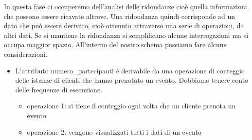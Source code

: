 In questa fase ci occuperemo dell'analisi delle ridondanze cioè quella informazioni che possono essere ricavate altrove.
Una ridondanza quindi corrisponde ad un dato che può essere derivato, cioè ottenuto attraverso una serie di operazioni, da altri dati.
Se si mantiene la ridondanza si semplificano alcune interrogazioni ma si occupa maggior spazio.
All'interno del nostro schema possiamo fare alcune considerazioni.

\begin{itemize}
    \item L'attributo numero{\_}partecipanti è derivabile da una operazione di conteggio delle istanze di clienti che hanno prenotato un evento.
    Dobbiamo tenere conto delle frequenze di esecuzione.
    \begin{itemize}
        \item operazione 1: si tiene il conteggio ogni volta che un cliente prenota un evento
        \item operazione 2: vengono visualizzati tutti i dati di un evento
    \end{itemize}
\end{itemize}